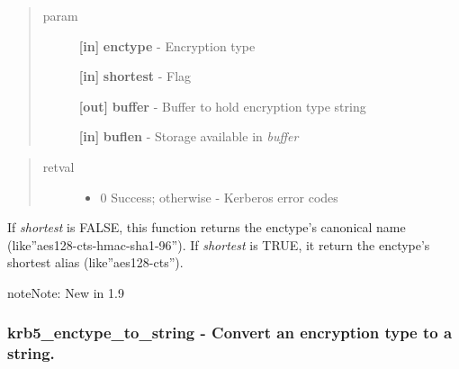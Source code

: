 \documentclass[letterpaper,10pt,english]{sphinxmanual}
\begin{document}
\begin{quote}\begin{description}
\item[{param}] \leavevmode
\textbf{{[}in{]}} \textbf{enctype} - Encryption type

\textbf{{[}in{]}} \textbf{shortest} - Flag

\textbf{{[}out{]}} \textbf{buffer} - Buffer to hold encryption type string

\textbf{{[}in{]}} \textbf{buflen} - Storage available in \emph{buffer}

\end{description}\end{quote}
\begin{quote}\begin{description}
\item[{retval}] \leavevmode\begin{itemize}
\item {} 
0   Success; otherwise - Kerberos error codes

\end{itemize}

\end{description}\end{quote}

If \emph{shortest} is FALSE, this function returns the enctype's canonical name (like''aes128-cts-hmac-sha1-96''). If \emph{shortest} is TRUE, it return the enctype's shortest alias (like''aes128-cts'').

\begin{notice}{note}{Note:}
New in 1.9
\end{notice}


\subsubsection{krb5\_enctype\_to\_string -  Convert an encryption type to a string.}
\label{appdev/refs/api/krb5_enctype_to_string::doc}\label{appdev/refs/api/krb5_enctype_to_string:krb5-enctype-to-string-convert-an-encryption-type-to-a-string}

\begin{fulllineitems}
\label{appdev/refs/api/krb5_enctype_to_string:c.krb5_enctype_to_string}
\end{fulllineitems}
\end{document}
